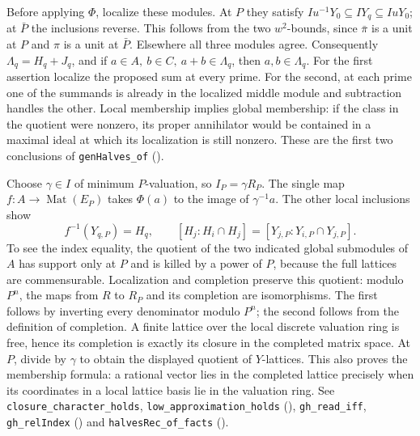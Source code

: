 Before applying \(\Phi\), localize these modules. At \(P\) they satisfy
\(Iu^{-1}Y_0\subseteq IY_q\subseteq IuY_0\); at \(\bar P\) the
inclusions reverse. This follows from the two \(w^2\)-bounds, since
\(\bar\pi\) is a unit at \(P\) and \(\pi\) is a unit at \(\bar P\).
Elsewhere all three modules agree. Consequently
\(\Lambda_q=H_q+J_q\), and if \(a\in A,\ b\in C,\ a+b\in\Lambda_q\),
then \(a,b\in\Lambda_q\).
For the first assertion localize the proposed sum at every prime. For
the second, at each prime one of the summands is already in the
localized middle module and subtraction handles the other. Local
membership implies global membership: if the class in the quotient
were nonzero, its proper annihilator would be contained in a maximal
ideal at which its localization is still nonzero.
These are the first two conclusions of \nolinkurl{genHalves_of}
().

Choose \(\gamma\in I\) of minimum \(P\)-valuation, so \(I_P=\gamma R_P\).
The single map \(f:A\to\operatorname{Mat}(E_P)\) takes \(\Phi(a)\)
to the image of \(\gamma^{-1}a\). The other local inclusions show
\[
 f^{-1}(Y_{q,P})=H_q,\qquad
 [H_j:H_i\cap H_j]=[Y_{j,P}:Y_{i,P}\cap Y_{j,P}].
\]
To see the index equality, the quotient of the two indicated global
submodules of \(A\) has support only at \(P\) and is killed by a power
of \(P\), because the full lattices are commensurable. Localization
and completion preserve this quotient: modulo \(P^n\), the maps from
\(R\) to \(R_P\) and its completion are isomorphisms. The first follows
by inverting every denominator modulo \(P^n\); the second follows from
the definition of completion. A finite lattice over the local discrete
valuation ring is free, hence its completion is exactly its closure in
the completed matrix space. At \(P\), divide by \(\gamma\) to obtain
the displayed quotient of \(Y\)-lattices. This also proves the membership
formula: a rational vector lies in the completed lattice precisely when
its coordinates in a local lattice basis lie in the valuation ring.
See \nolinkurl{closure_character_holds}, \nolinkurl{low_approximation_holds}
(),
\nolinkurl{gh_read_iff}, \nolinkurl{gh_relIndex}
()
and \nolinkurl{halvesRec_of_facts} ().

